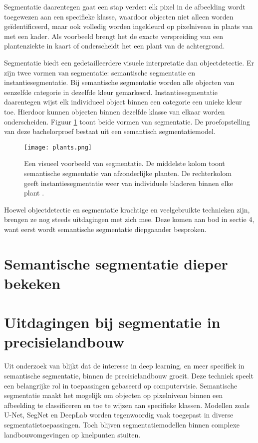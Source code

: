 Segmentatie daarentegen gaat een stap verder: elk pixel in de afbeelding wordt toegewezen aan een specifieke klasse, waardoor objecten niet alleen worden geïdentificeerd, maar ook volledig worden ingekleurd op pixelniveau in plaats van met een kader. Als voorbeeld brengt het de exacte verspreiding van een plantenziekte in kaart of onderscheidt het een plant van de achtergrond.
 
Segmentatie biedt een gedetailleerdere visuele interpretatie dan objectdetectie. Er zijn twee vormen van segmentatie: semantische segmentatie en instantiesegmentatie. Bij semantische segmentatie worden alle objecten van eenzelfde categorie in dezelfde kleur gemarkeerd. Instantiesegmentatie daarentegen wijst elk individueel object binnen een categorie een unieke kleur toe. Hierdoor kunnen objecten binnen dezelfde klasse van elkaar worden onderscheiden. Figuur \ref{fig:plants} toont beide vormen van segmentatie. De proefopstelling van deze bachelorproef bestaat uit een semantisch segmentatiemodel. 

\begin{figure}
    \centering
    \texttt{[image: plants.png]}
    \caption[Voorbeeld segmentatie.]{\label{fig:plants}Een visueel voorbeeld van segmentatie. De middelste kolom toont semantische segmentatie van afzonderlijke planten. De rechterkolom geeft instantiesegmentatie weer van individuele bladeren binnen elke plant \autocite{Lei2024}.}
\end{figure}

Hoewel objectdetectie en segmentatie krachtige en veelgebruikte technieken zijn, brengen ze nog steeds uitdagingen met zich mee. Deze komen aan bod in sectie 4, want eerst wordt semantische segmentatie diepgaander besproken.

\section{Semantische segmentatie dieper bekeken}

\section{Uitdagingen bij segmentatie in precisielandbouw}

Uit onderzoek van \textcite{Luo2024} blijkt dat de interesse in deep learning, en meer specifiek in semantische segmentatie, binnen de precisielandbouw groeit. Deze techniek speelt een belangrijke rol in toepassingen gebaseerd op computervisie. Semantische segmentatie maakt het mogelijk om objecten op pixelniveau binnen een afbeelding te classificeren en toe te wijzen aan specifieke klassen. Modellen zoals U-Net, SegNet en DeepLab worden tegenwoordig vaak toegepast in diverse segmentatietoepassingen. Toch blijven segmentatiemodellen binnen complexe landbouwomgevingen op knelpunten stuiten.

